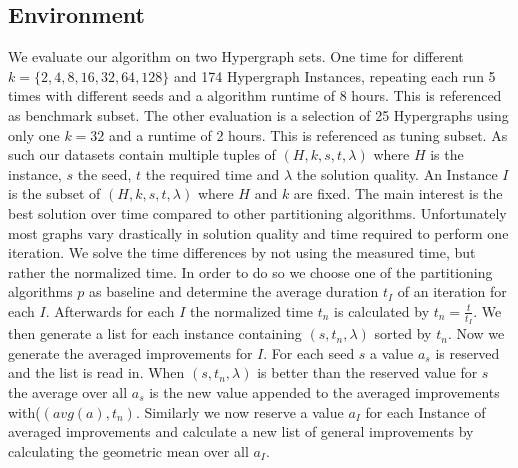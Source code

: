 \documentclass[a4paper,12pt,titlepage, BCOR7mm,headsepline]{scrbook}
\numberwithin{equation}{section}
\begin{document}
\subsection{Environment}
We evaluate our algorithm on two Hypergraph sets. One time for different $k = \{2,4,8,16,32,64,128\}$ and 174 Hypergraph Instances, repeating
each run 5 times with different seeds and a algorithm runtime of 8 hours. This is referenced as benchmark subset. The other evaluation is a
selection of 25 Hypergraphs using only one $k = 32$ and a runtime of 2 hours. This is referenced as tuning subset. 
As such our datasets contain multiple tuples of $(H, k, s, t, \lambda)$ where $H$ is the instance, $s$ the seed, $t$ the required time and $\lambda$ the solution quality. An Instance $I$ is the subset of $(H, k, s, t, \lambda)$ where $H$ and $k$ are fixed.
The main interest is the best solution over time compared to other partitioning algorithms. Unfortunately most graphs vary drastically in solution quality and time required to perform one iteration. We solve the time differences by not using the measured time, but rather the normalized time. 
In order to do so we choose one of the partitioning algorithms $p$ as baseline and determine the average duration $t_I$ of an iteration for each $I$. Afterwards for each $I$ the normalized time $t_n$ is calculated by $t_n = \frac{t}{t_I}$. We then generate a list for each instance containing $(s, t_n, \lambda)$ sorted by $t_n$. Now we generate the averaged improvements for $I$. For each seed $s$ a value $a_s$ is reserved and the list is read in. When $(s, t_n, \lambda)$ is better than the reserved value for $s$ the average over all $a_s$ 
is the new value appended to the averaged improvements with($(avg(a), t_n)$. Similarly we now reserve a value $a_I$ for each Instance of averaged improvements and calculate a new list of general improvements by calculating the geometric mean over all $a_I$. 
\end{document}
